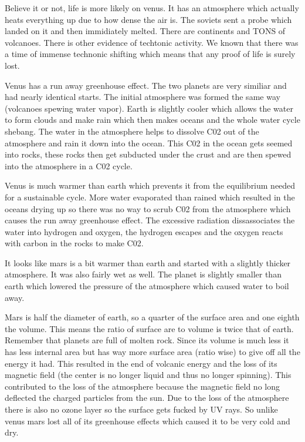\documentclass{article}
\begin{document}

Believe it or not, life is more likely on venus. It has an atmosphere which actually heats everything up due to how dense the air is. The soviets sent a probe which landed on it and then immidiately melted. There are continents and TONS of volcanoes. There is other evidence of techtonic activity. We known that there was a time of immense technonic shifting which means that any proof of life is surely lost.


Venus has a run away greenhouse effect. The two planets are very similiar and had nearly identical starts. The initial atmosphere was formed the same way (volcanoes spewing water vapor). Earth is slightly cooler which allows the water to form clouds and make rain which then makes oceans and the whole water cycle shebang. The water in the atmosphere helps to dissolve C02 out of the atmosphere and rain it down into the ocean. This C02 in the ocean gets seemed into rocks, these rocks then get subducted under the crust and are then spewed into the atmosphere in a C02 cycle.

Venus is much warmer than earth which prevents it from the equilibrium needed for a sustainable cycle. More water evaporated than rained which resulted in the oceans drying up so there was no way to scrub C02 from the atmosphere which causes the run away greenhouse effect. The excessive radiation dissassociates the water into hydrogen and oxygen, the hydrogen escapes and the oxygen reacts with carbon in the rocks to make C02.



It looks like mars is a bit warmer than earth and started with a slightly thicker atmosphere. It was also fairly wet as well. The planet is slightly smaller than earth which lowered the pressure of the atmosphere which caused water to boil away.


Mars is half the diameter of earth, so a quarter of the surface area and one eighth the volume. This means the ratio of surface are to volume is twice that of earth. Remember that planets are full of molten rock. Since its volume is much less it has less internal area but has way more surface area (ratio wise) to give off all the energy it had. This resulted in the end of volcanic energy and the loss of its magnetic field (the center is no longer liquid and thus no longer spinning). This contributed to the loss of the atmosphere because the magnetic field no long deflected the charged particles from the sun. Due to the loss of the atmosphere there is also no ozone layer so the surface gets fucked by UV rays. So unlike venus mars lost all of its greenhouse effects which caused it to be very cold and dry.
\end{document}
